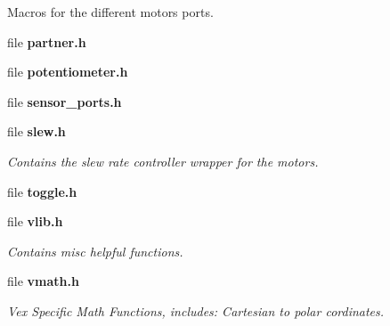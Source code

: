 \begin{DoxyCompactItemize}
\begin{DoxyCompactList}
Macros for the different motors ports. \end{DoxyCompactList}\item 
file \textbf{ partner.\+h}
\item 
file \textbf{ potentiometer.\+h}
\item 
file \textbf{ sensor\+\_\+ports.\+h}
\item 
file \textbf{ slew.\+h}
\begin{DoxyCompactList}\small\item\em Contains the slew rate controller wrapper for the motors. \end{DoxyCompactList}\item 
file \textbf{ toggle.\+h}
\item 
file \textbf{ vlib.\+h}
\begin{DoxyCompactList}\small\item\em Contains misc helpful functions. \end{DoxyCompactList}\item 
file \textbf{ vmath.\+h}
\begin{DoxyCompactList}\small\item\em Vex Specific Math Functions, includes\+: Cartesian to polar cordinates. \end{DoxyCompactList}\end{DoxyCompactItemize}
